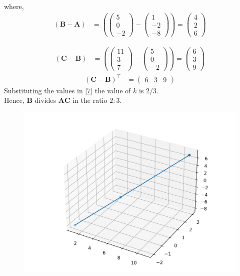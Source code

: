 \documentclass[12pt]{article}
\let\vec\mathbf
\providecommand{\brak}[1]{\ensuremath{\left(#1\right)}}
\newcommand{\myvec}[1]{\ensuremath{\begin{pmatrix}#1\end{pmatrix}}}
\let\vec\mathbf
\begin{document}
\begin{enumerate}
			where,
			\begin{align}
				\brak{\vec{B-A}} &=
				\brak{\myvec{5\\0\\-2}-\myvec{1\\-2\\-8}} =
				\myvec{4\\2\\6}
			\end{align}
			
			\begin{align}
				\brak{\vec{C-B}} &=
				\brak{\myvec{11\\3\\7}-\myvec{5\\0\\-2}} =
				\myvec{6\\3\\9}
			\end{align}
			\begin{align*}
				\brak{\vec{C}-\vec{B}}^{\top} &=
				\myvec{6 & 3 & 9}
			\end{align*}
			Substituting the values in \eqref{7} the value of $k$ is $2/3$.
			\\    Hence, $\vec{B}$ divides $\vec{AC}$ in the ratio $2:3$.
	\begin{figure}[!h]
		\begin{center}
			\includegraphics[width=\columnwidth]{figs/line_3d.png}
		\end{center}
		\caption{}
		\label{fig:Fig1}
	\end{figure}


\end{enumerate}
\end{document}
